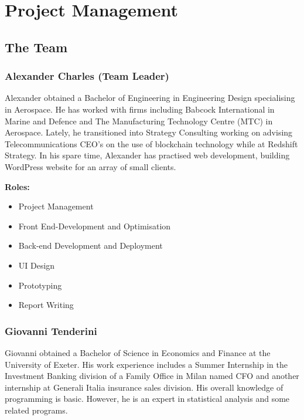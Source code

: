 \documentclass[fontsize=11pt]{extarticle}
\numberwithin{figure}{section} %
\numberwithin{table}{section}%
\providecommand{\tightlist}{%
  \setlength{\itemsep}{0pt}\setlength{\parskip}{0pt}}
\begin{document}
\hypertarget{project-management}{%
\section{Project Management}\label{project-management}}

\hypertarget{the-team}{%
\subsection{The Team}\label{the-team}}

\hypertarget{alexander-charles-team-leader}{%
\subsubsection{Alexander Charles (Team
Leader)}\label{alexander-charles-team-leader}}

Alexander obtained a Bachelor of Engineering in Engineering Design
specialising in Aerospace. He has worked with firms including Babcock
International in Marine and Defence and The Manufacturing Technology
Centre (MTC) in Aerospace. Lately, he transitioned into Strategy
Consulting working on advising Telecommunications CEO's on the use of
blockchain technology while at Redshift Strategy. In his spare time,
Alexander has practised web development, building WordPress website for
an array of small clients.

\textbf{Roles:}

\begin{itemize}
\tightlist
\item
  Project Management
\item
  Front End-Development and Optimisation
\item
  Back-end Development and Deployment
\item
  UI Design
\item
  Prototyping
\item
  Report Writing
\end{itemize}

\hypertarget{giovanni-tenderini}{%
\subsubsection{Giovanni Tenderini}\label{giovanni-tenderini}}

Giovanni obtained a Bachelor of Science in Economics and Finance at the
University of Exeter. His work experience includes a Summer Internship
in the Investment Banking division of a Family Office in Milan named CFO
and another internship at Generali Italia insurance sales division. His
overall knowledge of programming is basic. However, he is an expert in
statistical analysis and some related programs.
\end{document}
